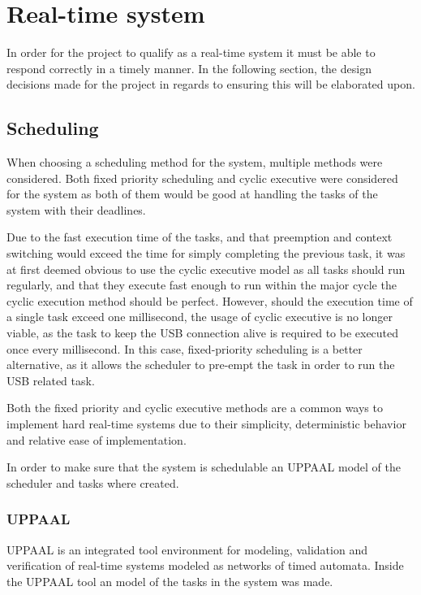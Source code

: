 \section{Real-time system}\label{Design:RTS} 
In order for the project to qualify as a real-time system it must be able to respond correctly in a timely manner.
In the following section, the design decisions made for the project in regards to ensuring this will be elaborated upon. 

\subsection{Scheduling}\label{Design:Scheduling}
When choosing a scheduling method for the system, multiple methods were considered. 
Both fixed priority scheduling and cyclic executive were considered for the system as both of them would be good at handling the tasks of the system with their deadlines.

Due to the fast execution time of the tasks, and that preemption and context switching would exceed the time for simply completing the previous task, it was at first deemed obvious to use the cyclic executive model as all tasks should run regularly, and that they execute fast enough to run within the major cycle the cyclic execution method should be perfect. 
However, should the execution time of a single task exceed one millisecond, the usage of cyclic executive is no longer viable, as the task to keep the USB connection alive is required to be executed once every millisecond.
In this case, fixed-priority scheduling is a better alternative, as it allows the scheduler to pre-empt the task in order to run the USB related task.

Both the fixed priority and cyclic executive methods are a common ways to implement hard real-time systems due to their simplicity, deterministic behavior and relative ease of implementation\cite{CyclicExecutionKimLarsen}.

In order to make sure that the system is schedulable an UPPAAL model of the scheduler and tasks where created. 

\subsubsection{UPPAAL}
UPPAAL is an integrated tool environment for modeling, validation and verification of real-time systems modeled as networks of timed automata\cite{UPPAALWebsite}. 
Inside the UPPAAL tool an model of the tasks in the system was made. 

